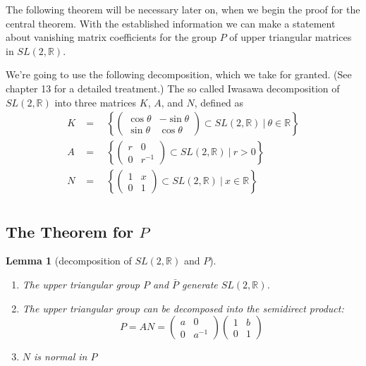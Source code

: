 \documentclass[
  12pt
]{article}
\theoremstyle{break}
\theoremstyle{plain}
\newtheorem{lem}[thm]{Lemma}
\newcommand{\sltr}{\ensuremath{SL(2, \mathbb{R})}\xspace}
\begin{document}
  The following theorem will be necessary later on, when we begin the proof for
  the central theorem. With the established information we can make a statement
  about vanishing matrix coefficients for the group $P$ of upper triangular
  matrices in \sltr.


  We're going to use the following decomposition, which we take for
  granted. (See \citeauthor{Hilgert2012}\cite{Hilgert2012} chapter 13 for a detailed treatment.)
  The so called Iwasawa decomposition of $SL(2, \mathbb{R})$ into three
  matrices $K$, $A$, and $N$, defined as
  \begin{align}
  K & =\quad \left\{ \begin{pmatrix} \cos\theta & -\sin\theta \\ \sin\theta & \cos\theta\end{pmatrix} \subset SL(2, \mathbb{R})  \ | \ \theta \in \mathbb{R} \right\} \\
  A & =\quad \left\{ \begin{pmatrix} r & 0 \\ 0 & r^{-1} \end{pmatrix} \subset SL(2, \mathbb{R})  \ | \ r > 0 \right\} \\
  N & =\quad \left\{ \begin{pmatrix} 1 & x \\ 0 & 1 \end{pmatrix} \subset SL(2, \mathbb{R})  \ | \ x \in \mathbb{R} \right\}\\
  \end{align}


  \hypertarget{theorem-for-p}{%
  \subsection{The Theorem for \texorpdfstring{$P$}{P}}\label{theorem-for-p}}

  \begin{lem}[decomposition of \sltr and $P$]
    \label{ref:lem:decomp}
    \begin{enumerate}
      \item The upper triangular group $P$ and $\bar{P}$ generate \sltr.
      \item The upper triangular group can be decomposed into the semidirect product:
        $$
        P = AN = \begin{pmatrix}a & 0 \\ 0 & a^{-1}\end{pmatrix} \begin{pmatrix}1 & b \\ 0 & 1\end{pmatrix}
        $$
      \item $N$ is normal in $P$
    \end{enumerate}
     
  \end{lem}
\end{document}
